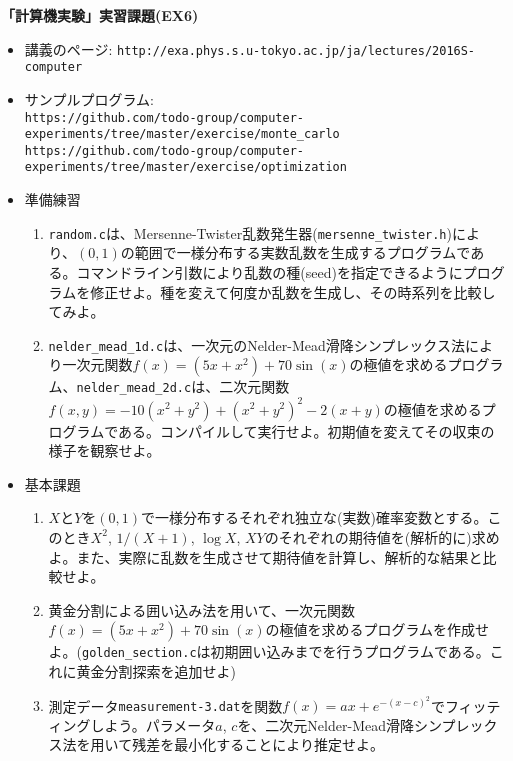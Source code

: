 \documentclass[11pt]{jarticle}
\begin{document}
\noindent
{\bf\large 「計算機実験」実習課題(EX6)}
\\[-0.5em]

\noindent
\begin{itemize}
\item 講義のページ: \verb+http://exa.phys.s.u-tokyo.ac.jp/ja/lectures/2016S-computer+

\item サンプルプログラム: \\ {\small \verb+https://github.com/todo-group/computer-experiments/tree/master/exercise/monte_carlo+} \\ {\small \verb+https://github.com/todo-group/computer-experiments/tree/master/exercise/optimization+}
  
\item 準備練習
  \begin{enumerate}
  \item {\tt random.c}は、Mersenne-Twister乱数発生器({\tt mersenne\_twister.h})により、$(0,1)$の範囲で一様分布する実数乱数を生成するプログラムである。コマンドライン引数により乱数の種(seed)を指定できるようにプログラムを修正せよ。種を変えて何度か乱数を生成し、その時系列を比較してみよ。
  \item {\tt nelder\_mead\_1d.c}は、一次元のNelder-Mead滑降シンプレックス法により一次元関数$f(x)=(5x+x^2)+70\sin(x)$の極値を求めるプログラム、{\tt nelder\_mead\_2d.c}は、二次元関数$f(x,y)=-10(x^2+y^2)+(x^2+y^2)^2-2(x+y)$の極値を求めるプログラムである。コンパイルして実行せよ。初期値を変えてその収束の様子を観察せよ。
  \end{enumerate}

\item 基本課題
  \begin{enumerate}
  \item $X$と$Y$を$(0,1)$で一様分布するそれぞれ独立な(実数)確率変数とする。このとき$X^2$, $1/(X+1)$, $\log X$, $XY$のそれぞれの期待値を(解析的に)求めよ。また、実際に乱数を生成させて期待値を計算し、解析的な結果と比較せよ。
  \item 黄金分割による囲い込み法を用いて、一次元関数$f(x)=(5x+x^2)+70\sin(x)$の極値を求めるプログラムを作成せよ。({\tt golden\_section.c}は初期囲い込みまでを行うプログラムである。これに黄金分割探索を追加せよ)
  \item 測定データ{\tt measurement-3.dat}を関数$f(x)=ax+e^{-(x-c)^2}$でフィッティングしよう。パラメータ$a$, $c$を、二次元Nelder-Mead滑降シンプレックス法を用いて残差を最小化することにより推定せよ。
  \end{enumerate}
  

\end{itemize}
\end{document}
